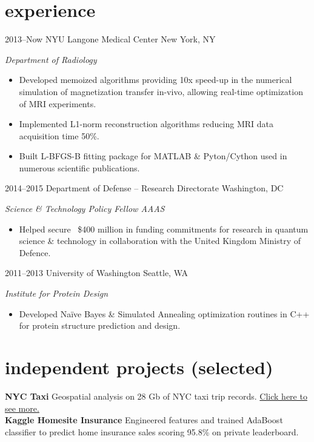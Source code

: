 \documentclass[]{friggeri-cv} %
\begin{document}

\section{experience}


\begin{entrylist}


\entry
{2013--Now}
{NYU Langone Medical Center}
{New York, NY}
{\emph{Department of Radiology}
\begin{itemize}
\item Developed memoized algorithms providing 10x speed-up in the numerical simulation of magnetization transfer in-vivo, allowing real-time optimization of MRI experiments.
\item Implemented L1-norm reconstruction algorithms reducing MRI data acquisition time 50\%.  
\item Built L-BFGS-B fitting package for MATLAB \& Pyton/Cython used in numerous scientific publications.    
\end{itemize}}

\entry
{2014--2015}
{Department of Defense -- Research Directorate}
{Washington, DC}
{\emph{Science \& Technology Policy Fellow AAAS}
\begin{itemize}
\item Helped secure ~\$400 million in funding commitments for research in quantum science \& technology in collaboration with the United Kingdom Ministry of Defence. 
\end{itemize}}

\entry
{2011--2013}
{University of Washington}
{Seattle, WA}
{\emph{Institute for Protein Design}
\begin{itemize}
\item Developed Na{\"i}ve Bayes \& Simulated Annealing optimization routines in C++ for protein structure prediction and design.\end{itemize}}


\end{entrylist}

\section{independent projects (selected)}
\textbf {{NYC Taxi}} Geospatial analysis on 28 Gb of NYC taxi trip records.  \href{https://cdn.rawgit.com/jfried23/nyc_taxi/1dbe38597f48650e661d613fcdb777e62b995bc7/html/chord_example/chord.html}{Click here to see more.}\\
\textbf{{Kaggle Homesite Insurance}}  Engineered features and trained AdaBoost classifier to predict home insurance sales scoring 95.8\% on private leaderboard. \\
\end{document}
